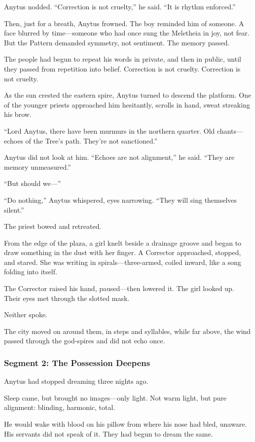 \documentclass[9pt]{article}
\begin{document}
Anytus nodded. “Correction is not cruelty,” he said. “It is rhythm enforced.”

Then, just for a breath, Anytus frowned. The boy reminded him of someone. A face blurred by time—someone who had once sung the Meletheia in joy, not fear. But the Pattern demanded symmetry, not sentiment. The memory passed.

The people had begun to repeat his words in private, and then in public, until they passed from repetition into belief. Correction is not cruelty. Correction is not cruelty.

As the sun crested the eastern spire, Anytus turned to descend the platform. One of the younger priests approached him hesitantly, scrolls in hand, sweat streaking his brow.

“Lord Anytus, there have been murmurs in the northern quarter. Old chants—echoes of the Tree’s path. They’re not sanctioned.”

Anytus did not look at him. “Echoes are not alignment,” he said. “They are memory unmeasured.”

“But should we—”

“Do nothing,” Anytus whispered, eyes narrowing. “They will sing themselves silent.”

The priest bowed and retreated.

From the edge of the plaza, a girl knelt beside a drainage groove and began to draw something in the dust with her finger. A Corrector approached, stopped, and stared. She was writing in spirals—three-armed, coiled inward, like a song folding into itself.

The Corrector raised his hand, paused—then lowered it. The girl looked up. Their eyes met through the slotted mask.

Neither spoke.

The city moved on around them, in steps and syllables, while far above, the wind passed through the god-spires and did not echo once.

\newpage

\subsubsection*{Segment 2: The Possession Deepens}

Anytus had stopped dreaming three nights ago.

Sleep came, but brought no images—only light. Not warm light, but pure alignment: blinding, harmonic, total. 

He would wake with blood on his pillow from where his nose had bled, unaware. His servants did not speak of it. They had begun to dream the same.
\end{document}
